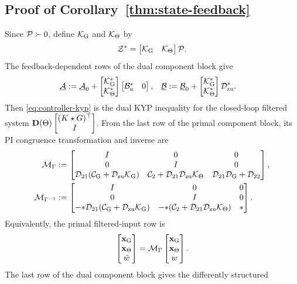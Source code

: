\subsection{Proof of Corollary~\ref{thm:state-feedback}}\label{proof:state-feedback}
Since $\mathcal{P}\succ0$, define $\mathcal{K}_{{\mathrm{G}}}$ and $\mathcal{K}_\Theta$ by
\[
\mathcal{Z}^*
=
\begin{bmatrix}\mathcal{K}_{{\mathrm{G}}}&\mathcal{K}_\Theta\end{bmatrix}\mathcal{P}.
\]
The feedback-dependent rows of the dual component block give
\begin{equation*}
\begin{aligned}
\underline{\mathcal{A}}
&:=
\underline{\mathcal{A}}_0
+
\begin{bmatrix}\mathcal{K}_{{\mathrm{G}}}^*\\\mathcal{K}_\Theta^*\end{bmatrix}
\begin{bmatrix}\mathcal{B}_{{\mathrm{u}}}^*&0\end{bmatrix},
&
\underline{\mathcal{B}}
&:=
\underline{\mathcal{B}}_0
+
\begin{bmatrix}\mathcal{K}_{{\mathrm{G}}}^*\\\mathcal{K}_\Theta^*\end{bmatrix}
\mathcal{D}_{{\mathrm{zu}}}^* .
\end{aligned}
\end{equation*}
Then \eqref{eq:controller-kyp} is the dual KYP inequality for
the closed-loop filtered system
$\mathbf{D}(\Theta)\begin{bmatrix}(K\star G)^\top\\I\end{bmatrix}$. From the last row of the
primal component block, its
PI congruence transformation and inverse are
\begin{equation*}
\begin{aligned}
\mathcal{M}_\Gamma
&:=\begin{bmatrix}
I&0&0\\
0&I&0\\
\mathcal{D}_{21}(\mathcal{C}_{{\mathrm{G}}}+\mathcal{D}_{{\mathrm{zu}}}\mathcal{K}_{{\mathrm{G}}})
&\mathcal{C}_2+\mathcal{D}_{21}\mathcal{D}_{{\mathrm{zu}}}\mathcal{K}_\Theta
&\mathcal{D}_{21}\mathcal{D}_{{\mathrm{G}}}+\mathcal{D}_{22}
\end{bmatrix},\\
\mathcal{M}_{\Gamma^{-1}}
&:=\begin{bmatrix}
I&0&0\\
0&I&0\\
-\mathcal{\Lambda}\mathcal{D}_{21}(\mathcal{C}_{{\mathrm{G}}}+\mathcal{D}_{{\mathrm{zu}}}\mathcal{K}_{{\mathrm{G}}})
&-\mathcal{\Lambda}(\mathcal{C}_2+\mathcal{D}_{21}\mathcal{D}_{{\mathrm{zu}}}\mathcal{K}_\Theta)
&\mathcal{\Lambda}
\end{bmatrix}.
\end{aligned}
\end{equation*}
Equivalently, the primal filtered-input row is
\begin{equation*}
\begin{bmatrix}\mathbf{x}_{{\mathrm{G}}}\\\mathbf{x}_\Theta\\\tilde w\end{bmatrix}
=\mathcal{M}_\Gamma
\begin{bmatrix}\mathbf{x}_{{\mathrm{G}}}\\\mathbf{x}_\Theta\\w\end{bmatrix}.
\end{equation*}
The last row of the dual component block gives the differently structured
